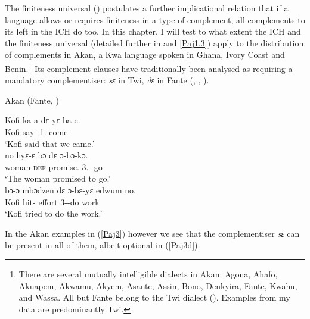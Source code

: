 \documentclass[output=paper]{langscibook}
\begin{document}
The finiteness universal (\citealt{wurmbrandetal2020}) postulates a further implicational relation that if a language allows or requires finiteness in a type of complement, all complements to its left in the ICH do too. In this chapter, I will test to what extent the ICH and the finiteness universal (detailed further in  and \ref{Paj1.3}) apply to the distribution of complements in Akan, a Kwa language spoken in Ghana, Ivory Coast and Benin.\footnote{There are several mutually intelligible dialects in Akan: Agona, Ahafo, Akuapem, Akwamu, Akyem, Asante, Assin, Bono, Denkyira, Fante, Kwahu, and Wassa. All but Fante belong to the Twi dialect (\citealt{osam2016}). Examples from my data are predominantly Twi.} Its complement clauses have traditionally been analysed as requiring a mandatory complementiser: \textit{sɛ} in Twi, \textit{dɛ} in Fante (\citealt{boadi1972}, \citealt{lord1976}, \citealt{osam1998}).

\begin{exe}
\ex Akan (Fante, \citealt{osam1998})

\begin{xlist}

\ex \label{Paj2a} 
\gll Kofi ka-a {d{ɛ}} {yɛ-ba-e}.\\
    Kofi say-{\compl} {\comp} 1{\pl}.{\subj}-come-{\compl}\\
\glt `Kofi said that we came.’\\

\ex \label{Paj2b}
 {no} {hy{ɛ}-{ɛ} b{ɔ}} {d{ɛ}} {{ɔ}-b{ɔ}-k{ɔ}}.\\
    woman \textsc{def} promise.{\compl} {\comp} 3{\sg}.{\subj}-{\fut}-go\\
\glt `The woman promised to go.’\\

\ex \label{Paj2c}
 {b{ɔ}-ɔ} {mb{ɔ}dzen} {d{ɛ}} {ɔ-bɛ-yɛ} {edwum} {no}.	\\
    Kofi hit-{\compl} effort {\comp} 3{\sg}-{\fut}-do work \\
\glt `Kofi tried to do the work.’\\

\end{xlist}
\end{exe}
 

In the Akan examples in (\ref{Paj3}) however we see that the complementiser \textit{sɛ} can be present in all of them, albeit optional in (\ref{Paj3d}). 
\end{document}
